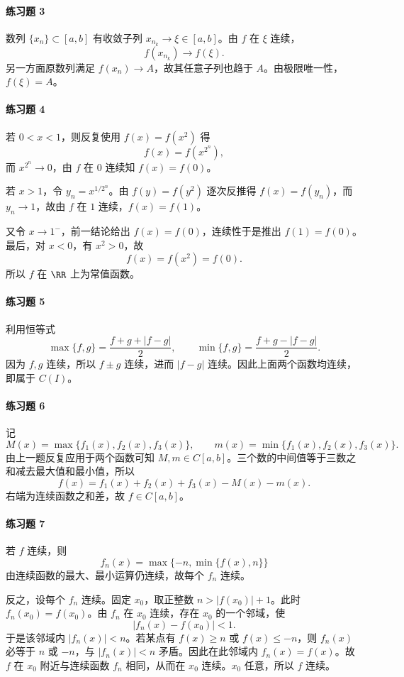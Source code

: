 \paragraph{练习题 3}
\begin{xsolution}
数列 $\{x_n\}\subset[a,b]$ 有收敛子列 $x_{n_k}\to\xi\in[a,b]$。由 $f$ 在 $\xi$ 连续，
\[
 f(x_{n_k})\to f(\xi).
\]
另一方面原数列满足 $f(x_n)\to A$，故其任意子列也趋于 $A$。由极限唯一性，$f(\xi)=A$。
\end{xsolution}

\paragraph{练习题 4}
\begin{xsolution}
若 $0<x<1$，则反复使用 $f(x)=f(x^2)$ 得
\[
 f(x)=f(x^{2^n}),
\]
而 $x^{2^n}\to0$，由 $f$ 在 $0$ 连续知 $f(x)=f(0)$。

若 $x>1$，令 $y_n=x^{1/2^n}$。由 $f(y)=f(y^2)$ 逐次反推得 $f(x)=f(y_n)$，而 $y_n\to1$，故由 $f$ 在 $1$ 连续，$f(x)=f(1)$。

又令 $x\to1^-$，前一结论给出 $f(x)=f(0)$，连续性于是推出 $f(1)=f(0)$。最后，对 $x<0$，有 $x^2>0$，故
\[
 f(x)=f(x^2)=f(0).
\]
所以 $f$ 在 $\RR$ 上为常值函数。
\end{xsolution}

\paragraph{练习题 5}
\begin{xsolution}
利用恒等式
\[
 \max\{f,g\}=\frac{f+g+|f-g|}{2},
 \qquad
 \min\{f,g\}=\frac{f+g-|f-g|}{2}.
\]
因为 $f,g$ 连续，所以 $f\pm g$ 连续，进而 $|f-g|$ 连续。因此上面两个函数均连续，即属于 $C(I)$。
\end{xsolution}

\paragraph{练习题 6}
\begin{xsolution}
记
\[
 M(x)=\max\{f_1(x),f_2(x),f_3(x)\},
 \qquad
 m(x)=\min\{f_1(x),f_2(x),f_3(x)\}.
\]
由上一题反复应用于两个函数可知 $M,m\in C[a,b]$。三个数的中间值等于三数之和减去最大值和最小值，所以
\[
 f(x)=f_1(x)+f_2(x)+f_3(x)-M(x)-m(x).
\]
右端为连续函数之和差，故 $f\in C[a,b]$。
\end{xsolution}

\paragraph{练习题 7}
\begin{xsolution}
若 $f$ 连续，则
\[
 f_n(x)=\max\{-n,\min\{f(x),n\}\}
\]
由连续函数的最大、最小运算仍连续，故每个 $f_n$ 连续。

反之，设每个 $f_n$ 连续。固定 $x_0$，取正整数 $n>|f(x_0)|+1$。此时 $f_n(x_0)=f(x_0)$。由 $f_n$ 在 $x_0$ 连续，存在 $x_0$ 的一个邻域，使
\[
 |f_n(x)-f(x_0)|<1.
\]
于是该邻域内 $|f_n(x)|<n$。若某点有 $f(x)\ge n$ 或 $f(x)\le-n$，则 $f_n(x)$ 必等于 $n$ 或 $-n$，与 $|f_n(x)|<n$ 矛盾。因此在此邻域内 $f_n(x)=f(x)$。故 $f$ 在 $x_0$ 附近与连续函数 $f_n$ 相同，从而在 $x_0$ 连续。$x_0$ 任意，所以 $f$ 连续。
\end{xsolution}

